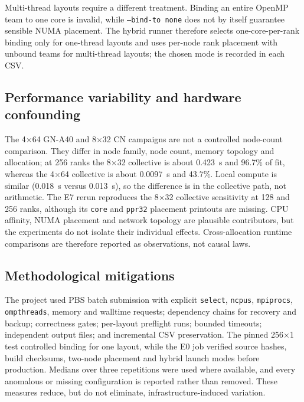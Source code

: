 \documentclass[10pt,a4paper]{article}
\newcommand{\code}[1]{\texttt{#1}}
\begin{document}
Multi-thread layouts require a different treatment. Binding an entire
OpenMP team to one core is invalid, while \code{--bind-to none} does not by
itself guarantee sensible NUMA placement. The hybrid runner therefore selects
one-core-per-rank binding only for one-thread layouts and uses per-node rank
placement with unbound teams for multi-thread layouts; the chosen mode is
recorded in each CSV.

\subsection{Performance variability and hardware confounding}
The 4$\times$64 GN-A40 and 8$\times$32 CN campaigns are not a controlled
node-count comparison. They differ in node family, node count, memory
topology and allocation; at 256 ranks the 8$\times$32 collective is about
0.423~s and 96.7\% of fit, whereas the 4$\times$64 collective is about
0.0097~s and 43.7\%. Local compute is similar (0.018~s versus 0.013~s), so the
difference is in the collective path, not arithmetic. The E7 rerun reproduces
the 8$\times$32 collective sensitivity at 128 and 256 ranks, although its
\code{core} and \code{ppr32} placement printouts are missing. CPU affinity,
NUMA placement and network topology are plausible contributors, but the
experiments do not isolate their individual effects. Cross-allocation runtime
comparisons are therefore reported as observations, not causal laws.

\subsection{Methodological mitigations}
The project used PBS batch submission with explicit \code{select},
\code{ncpus}, \code{mpiprocs}, \code{ompthreads}, memory and walltime
requests; dependency chains for recovery and backup; correctness gates;
per-layout preflight runs; bounded timeouts; independent output files; and
incremental CSV preservation. The pinned 256$\times$1 test controlled binding
for one layout, while the E0 job verified source hashes, build checksums,
two-node placement and hybrid launch modes before production. Medians over
three repetitions were used where available, and every anomalous or missing
configuration is reported rather than removed. These measures reduce, but do
not eliminate, infrastructure-induced variation.
\end{document}
